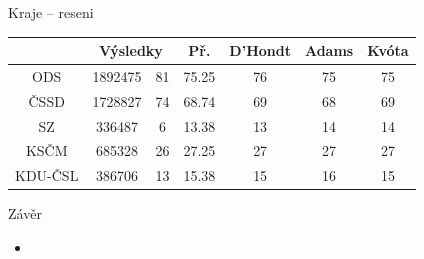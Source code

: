 \documentclass[17pt]{beamer}
\begin{document}
\begin{frame}{Kraje -- reseni}
\footnotesize
\begin{tabular}{|c|c|c|c|c|c|c|} \hline
 & \multicolumn{2}{c|}{Výsledky} & Př. & D'Hondt & Adams & Kvóta\\
\hline ODS & 1892475 & 81 & 75.25 & 76 & 75 & 75\\
\hline ČSSD & 1728827 & 74 & 68.74 & 69 & 68 & 69\\
\hline SZ & 336487 & 6 & 13.38 & 13 & 14 & 14 \\
\hline KSČM & 685328 & 26 & 27.25 & 27 & 27 & 27 \\
\hline KDU-ČSL & 386706 & 13 & 15.38 & 15 & 16 & 15 \\
\hline
\end{tabular}
\end{frame}

\begin{frame}{Závěr}
\begin{itemize}
\item 
\end{itemize}
\end{frame}
\end{document}
